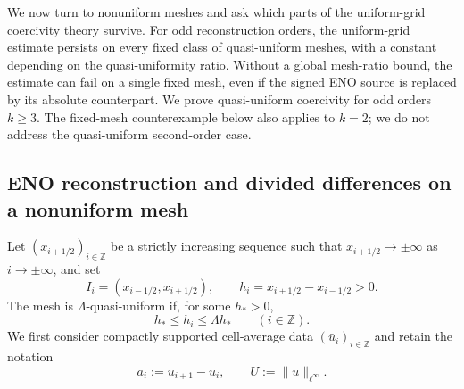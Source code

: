 \documentclass[11pt]{amsart}
\theoremstyle{plain}
\theoremstyle{definition}
\theoremstyle{remark}
\numberwithin{equation}{section}
\theoremstyle{plain}
\begin{document}
We now turn to nonuniform meshes and ask which parts of the uniform-grid
coercivity theory survive.  For odd reconstruction orders, the uniform-grid estimate persists on
every fixed class of quasi-uniform meshes, with a constant depending on the
quasi-uniformity ratio.
Without a global mesh-ratio bound, the estimate can fail on a single
fixed mesh, even if the signed ENO source is replaced by its absolute
counterpart.
We prove quasi-uniform coercivity for odd orders $k\ge3$.  The fixed-mesh
counterexample below also applies to $k=2$; we do not address the quasi-uniform
second-order case.


\subsection{ENO reconstruction and divided differences on a nonuniform mesh}
\label{sec:nonuniform-reconstruction}

Let $(x_{i+1/2})_{i\in\mathbb Z}$ be a strictly increasing sequence such
that $x_{i+1/2}\to\pm\infty$ as $i\to\pm\infty$, and set
\begin{equation}\label{eq:nonuniform-cells}
	I_i=(x_{i-1/2},x_{i+1/2}),
	\qquad
	h_i=x_{i+1/2}-x_{i-1/2}>0.
\end{equation}
The mesh is $\Lambda$-quasi-uniform if, for some $h_*>0$,
\begin{equation}\label{eq:nonuniform-quasi-uniformity}
	h_*\le h_i\le\Lambda h_*
	\qquad(i\in\mathbb Z).
\end{equation}
We first consider compactly supported cell-average data
$(\bar u_i)_{i\in\mathbb Z}$ and retain the notation
\begin{equation}\label{eq:nonuniform-jumps-amplitude}
	a_i:=\bar u_{i+1}-\bar u_i,
	\qquad
	U:=\|\bar u\|_{\ell^\infty}.
\end{equation}
\end{document}
